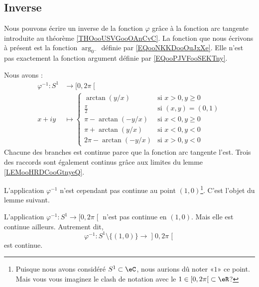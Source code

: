 \subsection{Inverse}
\label{SUBSECooWFNMooOuZBRN}

Nous pouvons écrire un inverse de la fonction \( \varphi\) grâce à la fonction arc tangente introduite au théorème \ref{THOooUSVGooOAnCvC}.
La fonction que nous écrivons à présent est la fonction \( \arg_{0^{-}} \) définie par \eqref{EQooNKKDooOuJxXe}. Elle n'est pas exactement la fonction argument définie par \eqref{EQooPJVFooSEKTny}.

Nous avons :
\begin{equation}        \label{EQooSAYFooRFVSPc}
	\begin{aligned}
		\varphi^{-1}\colon S^1 & \to \mathopen[ 0 , 2\pi \mathclose[ \\
		x+iy                   & \mapsto
		\begin{cases}
			\arctan(y/x)       & \text{si } x>0,y\geq 0 \\
			\frac{ \pi }{2}    & \text{si }(x,y)=(0,1)  \\
			\pi-\arctan(-y/x)  & \text{si }x<0,y\geq 0  \\
			\pi+\arctan(y/x)   & \text{si }x<0,y<0      \\
			2\pi-\arctan(-y/x) & \text{si }x>0,y<0
		\end{cases}
	\end{aligned}
\end{equation}
Chacune des branches est continue parce que la fonction arc tangente l'est. Trois des raccords sont également continus grâce aux limites du lemme \ref{LEMooHRDCooGtnyeQ}.

L'application \( \varphi^{-1}\) n'est cependant pas continue au point \( (1,0)\)\footnote{Puisque nous avons considéré \( S^1\subset \eC\), nous aurions dû noter «\( 1\)» ce point. Mais vous vous imaginez le clash de notation avec le \( 1\in \mathopen[ 0 , 2\pi \mathclose[\subset \eR\)?}. C'est l'objet du lemme suivant.

\begin{lemma}       \label{LEMooEQVRooMAffCw}
	L'application \( \varphi^{-1}\colon S^1\to \mathopen[ 0 , 2\pi \mathclose[\) n'est pas continue en \( (1,0)\). Mais elle est continue ailleurs. Autrement dit,
	\begin{equation}
		\varphi^{-1}\colon S^1\setminus\{ (1,0) \}\to \mathopen] 0 , 2\pi \mathclose[
	\end{equation}
	est continue.
\end{lemma}

